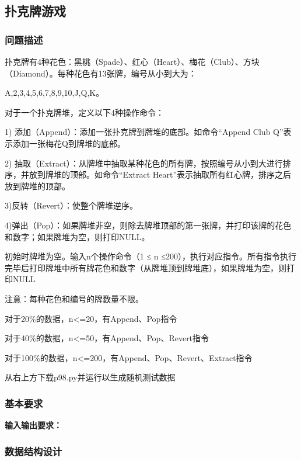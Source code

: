 \documentclass{article}
\begin{document}
\subsection{扑克牌游戏}
\subsubsection{问题描述}
扑克牌有4种花色：黑桃（Spade）、红心（Heart）、梅花（Club）、方块（Diamond）。每种花色有13张牌，编号从小到大为：\par
A,2,3,4,5,6,7,8,9,10,J,Q,K。\par

对于一个扑克牌堆，定义以下4种操作命令：\par

1) 添加（Append）：添加一张扑克牌到牌堆的底部。如命令“Append Club Q”表示添加一张梅花Q到牌堆的底部。\par

2) 抽取（Extract）：从牌堆中抽取某种花色的所有牌，按照编号从小到大进行排序，并放到牌堆的顶部。如命令“Extract Heart”表示抽取所有红心牌，排序之后放到牌堆的顶部。\par

3)反转（Revert）：使整个牌堆逆序。\par

4)弹出（Pop）：如果牌堆非空，则除去牌堆顶部的第一张牌，并打印该牌的花色和数字；如果牌堆为空，则打印NULL。\par

初始时牌堆为空。输入n个操作命令（1 ≤ n ≤200），执行对应指令。所有指令执行完毕后打印牌堆中所有牌花色和数字（从牌堆顶到牌堆底），如果牌堆为空，则打印NULL\par

注意：每种花色和编号的牌数量不限。\par

对于20\%的数据，n<=20，有Append、Pop指令\par    

对于40\%的数据，n<=50，有Append、Pop、Revert指令\par

对于100\%的数据，n<=200，有Append、Pop、Revert、Extract指令\par

从右上方下载p98.py并运行以生成随机测试数据
\subsubsection{基本要求}
\textbf{输入输出要求：}\par
\subsubsection{数据结构设计}
\end{document}

